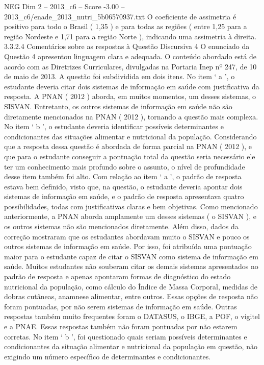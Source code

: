 \begin{textsample}{NEG Dim 2 – 2013\_c6 – Score -3.00 – 2013\_c6/enade\_2013\_nutri\_5b06570937.txt}
O coeficiente de assimetria é positivo para todo o Brasil ( 1,35 ) e para todas as regiões ( entre 1,25 para a região Nordeste e 1,71 para a região Norte ), indicando uma assimetria à direita. 3.3.2.4 Comentários sobre as respostas à Questão Discursiva 4 O enunciado da Questão 4 apresentou linguagem clara e adequada.
O conteúdo abordado está de acordo com as Diretrizes Curriculares, divulgadas na Portaria Inep nº 247, de 10 de maio de 2013.
A questão foi subdividida em dois itens.
No item ‘ a ’, o estudante deveria citar dois sistemas de informação em saúde com justificativa da resposta.
A PNAN ( 2012 ) aborda, em muitos momentos, um desses sistemas, o SISVAN.
Entretanto, os outros sistemas de informação em saúde não são diretamente mencionados na PNAN ( 2012 ), tornando a questão mais complexa.
No item ‘ b ’, o estudante deveria identificar possíveis determinantes e condicionantes das situações alimentar e nutricional da população.
Considerando que a resposta dessa questão é abordada de forma parcial na PNAN ( 2012 ), e que para o estudante conseguir a pontuação total da questão seria necessário ele ter um conhecimento mais profundo sobre o assunto, o nível de profundidade desse item também foi alto.
Com relação ao item ‘ a ’, o padrão de resposta estava bem definido, visto que, na questão, o estudante deveria apontar dois sistemas de informação em saúde, e o padrão de resposta apresentava quatro possibilidades, todas com justificativas claras e bem objetivas.
Como mencionado anteriormente, a PNAN aborda amplamente um desses sistemas ( o SISVAN ), e os outros sistemas não são mencionados diretamente.
Além disso, dados da correção mostraram que os estudantes abordavam muito o SISVAN e pouco os outros sistemas de informação em saúde.
Por isso, foi atribuída uma pontuação maior para o estudante capaz de citar o SISVAN como sistema de informação em saúde.
Muitos estudantes não souberam citar os demais sistemas apresentados no padrão de resposta e apenas apontaram formas de diagnóstico do estado nutricional da população, como cálculo do Índice de Massa Corporal, medidas de dobras cutâneas, anamnese alimentar, entre outros.
Essas opções de resposta não foram pontuadas, por não serem sistemas de informação em saúde.
Outras respostas também muito frequentes foram o DATASUS, o IBGE, a POF, o vigitel e a PNAE.
Essas respostas também não foram pontuadas por não estarem corretas.
No item ‘ b ’, foi questionado quais seriam possíveis determinantes e condicionantes da situação alimentar e nutricional da população em questão, não exigindo um número específico de determinantes e condicionantes.

\end{textsample}
